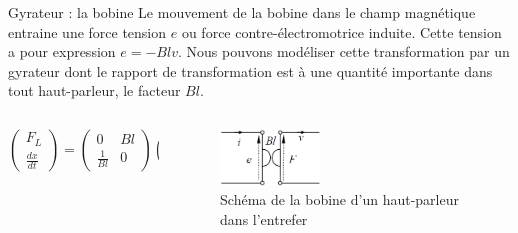 \documentclass[aspectratio=169]{beamer}
\begin{document}
\begin{frame}{Gyrateur : la bobine}
Le mouvement de la bobine dans le champ magnétique entraine une force tension $e$ ou force contre-électromotrice induite. 
Cette tension a pour expression $e = -Blv$.
Nous pouvons modéliser cette transformation par un gyrateur dont le rapport de transformation est à une quantité importante dans tout haut-parleur, le facteur $Bl$.
\begin{columns}[t]\small
  \begin{column}{.5\textwidth}
  	\vfill
	\begin{displaymath}
	\left( \begin{array}{c} F_L \\ \frac{dx}{dt} \end{array} \right)
	= \left( \begin{array}{cc} 0 & Bl\\ \frac{1}{Bl} & 0 \end{array} \right)
	\left( \begin{array}{c} e \\ i \end{array} \right)
	\end{displaymath}
  \end{column}
  \begin{column}{.5\textwidth}
	\begin{figure}[!h]
	\begin{center}
	\includegraphics[width=0.4\textwidth]{figure/gyrateur.png}
	\end{center}
	\caption{Schéma de la bobine d'un haut-parleur dans l'entrefer}
	\label{gyrateur}
	\end{figure}	
  \end{column}
\end{columns}
\end{frame}
\end{document}
